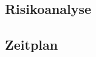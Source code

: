 \documentclass[12pt]{article}
\begin{document}
	\subsection{Risikoanalyse}\label{Anhang:Risikoanalyse}
		\begin{minipage}[b]{\textwidth}
		
	\end{minipage}
	\newpage
	\subsection{Zeitplan}\label{Anhang:Zeitplan}
	\begin{minipage}[b]{\textwidth}
		
	\end{minipage}
	
\end{document}
